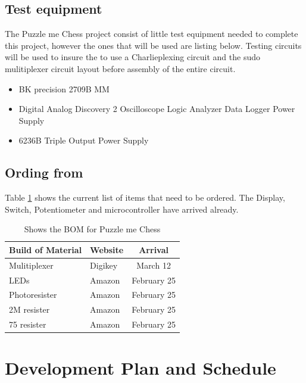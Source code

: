 \documentclass[11pt]{article}
\begin{document}
\subsection{Test equipment}
The Puzzle me Chess project consist of little test equipment needed to complete this project, however the ones that will be used are listing below. Testing circuits will be used to insure the to use a Charlieplexing circuit and the sudo mulitiplexer circuit layout before assembly of the entire circuit. 
\begin{itemize}
\item BK precision 2709B MM
\item Digital Analog Discovery 2
\subitem Oscilloscope
\subitem Logic Analyzer
\subitem Data Logger
\subitem Power Supply
\item 6236B Triple Output Power Supply 

\end{itemize}

\subsection{Ording from}
Table \ref{tab:ording} shows the current list of items that need to be ordered. The Display, Switch, Potentiometer and microcontroller have arrived already. 
\begin{table} 
\begin{center}
    \begin{tabular}{| l | l | c |}
    \hline
    Build of Material  & Website & Arrival \\ \hline
    Mulitiplexer & Digikey & March 12 \\ \hline 
    LEDs & Amazon & February 25 \\ \hline
    Photoresister & Amazon & February 25 \\ \hline
    2M resister & Amazon & February 25 \\ \hline
    75 resister & Amazon  & February 25 \\ \hline
    \end{tabular}
    \caption{Shows the BOM for Puzzle me Chess}
	\label{tab:ording}
\end{center}
\end{table}

\section{Development Plan and Schedule}
\end{document}
